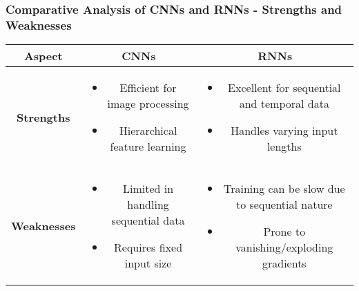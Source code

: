 \documentclass[aspectratio=169]{beamer}
\begin{document}
\begin{frame}[fragile]
    \frametitle{Comparative Analysis of CNNs and RNNs - Strengths and Weaknesses}
    \begin{table}[ht]
        \centering
        \begin{tabular}{|c|c|c|}
            \hline
            \textbf{Aspect} & \textbf{CNNs} & \textbf{RNNs} \\ 
            \hline
            \textbf{Strengths} & 
            \begin{itemize}
                \item Efficient for image processing 
                \item Hierarchical feature learning
            \end{itemize} & 
            \begin{itemize}
                \item Excellent for sequential and temporal data 
                \item Handles varying input lengths
            \end{itemize} \\ 
            \hline
            \textbf{Weaknesses} & 
            \begin{itemize}
                \item Limited in handling sequential data 
                \item Requires fixed input size
            \end{itemize} & 
            \begin{itemize}
                \item Training can be slow due to sequential nature 
                \item Prone to vanishing/exploding gradients
            \end{itemize} \\ 
            \hline
        \end{tabular}
    \end{table}
\end{frame}
\end{document}
